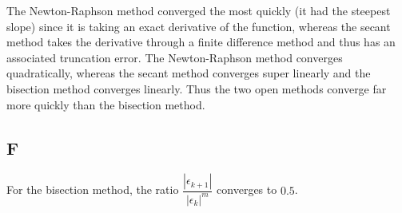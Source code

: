 \documentclass{article}
\begin{document}
The Newton-Raphson method converged the most quickly (it had the steepest slope) since it is taking an exact derivative of the function, whereas the secant method takes the derivative through a finite difference method and thus has an associated truncation error.  The Newton-Raphson method converges quadratically, whereas the secant method converges super linearly and the bisection method converges linearly.  Thus the two open methods converge far more quickly than the bisection method.


\subsection*{F}

For the bisection method, the ratio $ \dfrac{ |\epsilon_{k+1} |}{|\epsilon_k|^m} $ converges to $ 0.5 $.
\end{document}
